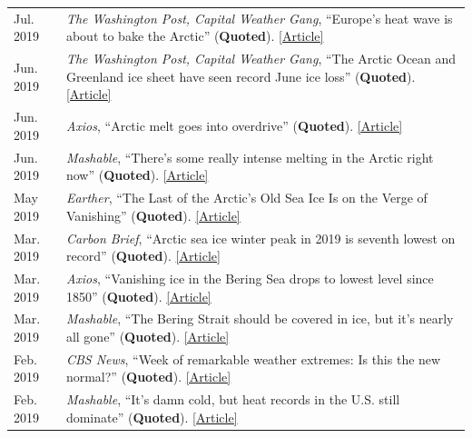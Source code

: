 \documentclass[margin,line,palatino,courier,10pt]{res}
\begin{document}
\begin{resume}
\begin{tabular}{@{}p{0.9in}p{4in}}
Jul. 2019 & \textit{The Washington Post, Capital Weather Gang}, ``Europe's heat wave is about to bake the Arctic'' (\textbf{Quoted}). \href{https://www.washingtonpost.com/weather/2019/07/26/europes-heat-wave-is-about-bake-arctic/?utm_term=.f57032deb299}{[Article]}\\
Jun. 2019 & \textit{The Washington Post, Capital Weather Gang}, ``The Arctic Ocean and Greenland ice sheet have seen record June ice loss'' (\textbf{Quoted}). \href{https://www.washingtonpost.com/weather/2019/06/14/arctic-ocean-greenland-ice-sheet-have-seen-record-june-ice-loss/?utm_term=.7539db99ca6e}{[Article]}\\
Jun. 2019 & \textit{Axios}, ``Arctic melt goes into overdrive'' (\textbf{Quoted}). \href{https://www.axios.com/newsletters/axios-science-9172185b-a9a1-498f-9014-4ee04e1ff826.html?chunk=3#story3}{[Article]}\\
Jun. 2019 & \textit{Mashable}, ``There's some really intense melting in the Arctic right now'' (\textbf{Quoted}). \href{https://mashable.com/article/arctic-melting-records/}{[Article]}\\
May 2019 & \textit{Earther}, ``The Last of the Arctic's Old Sea Ice Is on the Verge of Vanishing'' (\textbf{Quoted}). \href{https://earther.gizmodo.com/the-last-of-the-arctics-old-sea-ice-is-on-the-verge-of-1834510753}{[Article]}\\
Mar. 2019 & \textit{Carbon Brief}, ``Arctic sea ice winter peak in 2019 is seventh lowest on record'' (\textbf{Quoted}). \href{https://www.carbonbrief.org/arctic-sea-ice-winter-peak-in-2019-is-seventh-lowest-on-record}{[Article]}\\
Mar. 2019 & \textit{Axios}, ``Vanishing ice in the Bering Sea drops to lowest level since 1850'' (\textbf{Quoted}). \href{https://www.axios.com/bering-sea-ice-vanishing-a23bacda-a08d-4ec7-9124-419b90b984a2.html}{[Article]}\\
Mar. 2019 &\textit{Mashable}, ``The Bering Strait should be covered in ice, but it's nearly all gone'' (\textbf{Quoted}). \href{https://mashable.com/article/bering-strait-sea-ice-gone-2019-arctic/#zs3hdvbg3mqc}{[Article]}\\
Feb. 2019 & \textit{CBS News}, ``Week of remarkable weather extremes: Is this the new normal?'' (\textbf{Quoted}). \href{https://www.cbsnews.com/news/remarkable-weather-extremes-is-this-the-new-normal-climate-change/?ftag=CNM-00-10aab7e&linkId=64169123}{[Article]}\\
Feb. 2019 & \textit{Mashable}, ``It's damn cold, but heat records in the U.S. still dominate'' (\textbf{Quoted}). \href{https://mashable.com/article/polar-vortex-climate-change-cold-record/#xQmvXhcFJPqH}{[Article]}\\

\end{tabular}
\end{resume}
\end{document}
